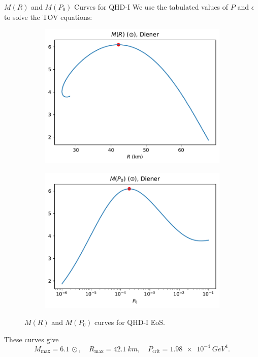\documentclass[handout]{beamer}
\begin{document}
    \begin{frame}{$M(R)$ and $M(P_0)$ Curves for QHD-I}
        We use the tabulated values of $P$ and $\epsilon$ to solve the TOV equations: \pause
        \begin{figure}[h!]
            \centering
            \begin{subfigure}{.5\textwidth}
                \includegraphics[width = \textwidth]{../paper/images/qhd1/r_analysis.pdf}
            \end{subfigure}%
            \begin{subfigure}{.5\textwidth}
                \includegraphics[width = \textwidth]{../paper/images/qhd1/p0_analysis.pdf}
            \end{subfigure}
            \caption[]{$M(R)$ and $M(P_0)$ curves for QHD-I EoS.}
        \end{figure}\pause
        \vspace{-3pt}
        These curves give \[M_\text{max} = \SI{6.1}{\odot}, \quad R_\text{max} = \SI{42.1}{km}, \quad P_\text{crit} = \SI{1.98e-4}{GeV^4}.\]
    \end{frame}
\end{document}
